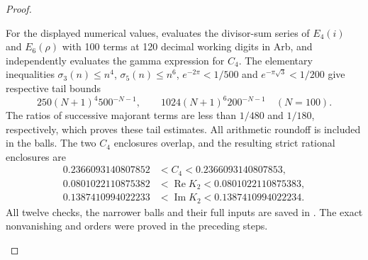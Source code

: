 \begin{proof}
\begin{enumerate}[label={$\langle1\rangle$\arabic*.},leftmargin=*]
For the displayed numerical values,
evaluates the divisor-sum series of $E_4(i)$ and $E_6(\rho)$
with 100 terms at 120 decimal working digits in Arb, and independently
evaluates the gamma expression for $C_4$.
The elementary inequalities $\sigma_3(n)\le n^4$,
$\sigma_5(n)\le n^6$, $e^{-2\pi}<1/500$ and
$e^{-\pi\sqrt3}<1/200$ give respective tail bounds
\[
250(N+1)^4 500^{-N-1},\qquad
1024(N+1)^6 200^{-N-1}\quad(N=100).
\]
The ratios of successive majorant terms are less than $1/480$
and $1/180$, respectively, which proves these tail estimates.
All arithmetic roundoff is included in the balls. The two $C_4$
enclosures overlap, and the resulting strict rational enclosures are
\[
\begin{aligned}
0.2366093140807852&<C_4<0.2366093140807853,\\
0.0801022110875382&<\operatorname{Re}K_2<0.0801022110875383,\\
0.1387410994022233&<\operatorname{Im}K_2<0.1387410994022234.
\end{aligned}
\]
All twelve checks, the narrower balls and their full inputs are
saved in . The exact nonvanishing
and orders were proved in the preceding steps.
\end{enumerate}
\end{proof}
